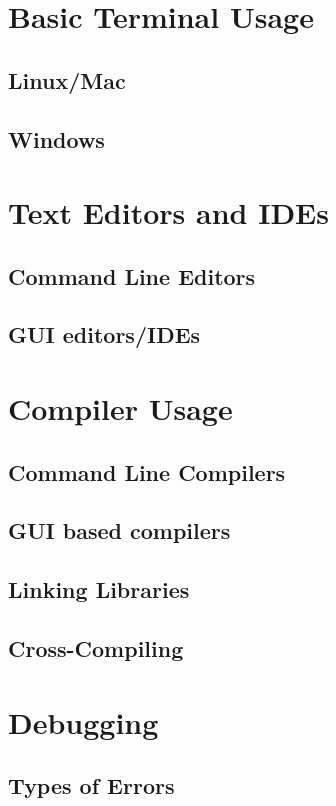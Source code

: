\documentclass[12pt]{book}
\begin{document}
	\section{Basic Terminal Usage}
		\subsection{Linux/Mac}
		\subsection{Windows}
	
	\section{Text Editors and IDEs}
		\subsection{Command Line Editors}
		\subsection{GUI editors/IDEs}
		
	\section{Compiler Usage}
		\subsection{Command Line Compilers}
		\subsection{GUI based compilers}
		\subsection{Linking Libraries}
		\subsection{Cross-Compiling}
		
	\section{Debugging}
		\subsection{Types of Errors}
\end{document}
